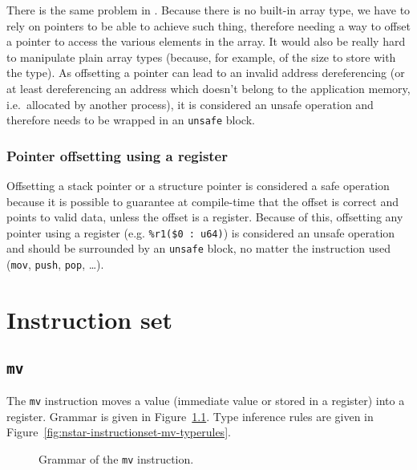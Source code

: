 There is the same problem in \nstar.
Because there is no built-in array type, we have to rely on pointers to be able to achieve such thing, therefore needing a way to offset a pointer to access the various elements in the array.
It would also be really hard to manipulate plain array types (because, for example, of the size to store with the type).
As offsetting a pointer can lead to an invalid address dereferencing (or at least dereferencing an address which doesn't belong to the application memory, i.e.\ allocated by another process), it is considered an unsafe operation and therefore needs to be wrapped in an \texttt{unsafe} block.

\subsection{Pointer offsetting using a register}\label{subsec:nstar-common-unsafe-ptroffsetreg}

Offsetting a stack pointer or a structure pointer is considered a safe operation because it is possible to guarantee at compile-time that the offset is correct and points to valid data, unless the offset is a register.
Because of this, offsetting any pointer using a register (e.g. \texttt{\%r1(\$0 : u64)}) is considered an unsafe operation and should be surrounded by an \texttt{unsafe} block, no matter the instruction used (\texttt{mov}, \texttt{push}, \texttt{pop}, \ldots).

\chapter{Instruction set}\label{chap:nstar-instructionset}

\section{\texttt{mv}}\label{sec:nstar-instructionset-mv}

The \texttt{mv} instruction moves a value (immediate value or stored in a register) into a register.
Grammar is given in Figure~\ref{fig:nstar-instructionset-mv-grammar}.
Type inference rules are given in Figure~\ref{fig:nstar-instructionset-mv-typerules}.

\begin{figure}[H]
  \centering


  \caption{Grammar of the \texttt{mv} instruction.}
  \label{fig:nstar-instructionset-mv-grammar}
\end{figure}

